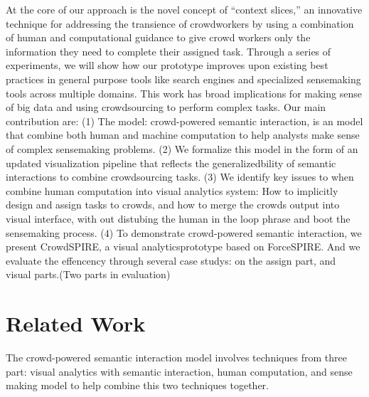 \documentclass[journal]{vgtc}                %
\begin{document}
At the core of our approach is the novel concept of “context slices,” an innovative technique for addressing the transience of crowdworkers by using a combination of human and computational guidance to give crowd workers only the information they need to complete their assigned task.
Through a series of experiments, we will show how our prototype improves upon existing best practices in general purpose tools like search engines and specialized sensemaking tools across multiple domains. This work has broad implications for making sense of big data and using crowdsourcing to perform complex tasks.
Our main contribution are:
(1) The model: crowd-powered semantic interaction, is an model that combine both human and machine computation to help analysts make sense of complex sensemaking problems.
(2) We formalize this model in the form of an updated visualization pipeline  that reflects the generalizedbility of semantic interactions to combine crowdsourcing tasks.
(3) We identify key issues to when combine human computation into visual analytics system: How to implicitly design and assign tasks to crowds, and how to merge the crowds output into visual interface, with out distubing the human in the loop phrase and boot the sensemaking process.
(4) To demonstrate crowd-powered semantic interaction, we present CrowdSPIRE, a visual analyticsprototype based on ForceSPIRE. And we evaluate the effencency through several case studys: on the assign part, and visual parts.(Two parts in evaluation)


\section{Related Work}
The crowd-powered semantic interaction model involves techniques from three part: visual analytics with semantic interaction, human computation, and sense making model to help combine this two techniques together.
\end{document}

